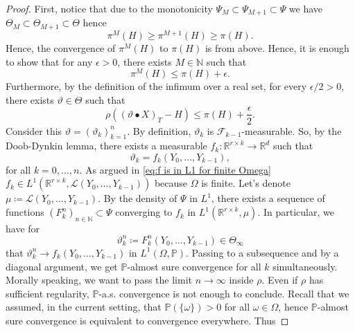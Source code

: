 \documentclass[11pt,a4paper,twoside,openany]{report}
\theoremstyle{plain} %
\theoremstyle{definition} %
\theoremstyle{remark} %
\begin{document}
\begin{proof}
 First, notice that due to the monotonicity \(\Psi_M\subset\Psi_{M+1}\subset\Psi\) we have \(\Theta_M\subset\Theta_{M+1}\subset\Theta\) hence 
 \begin{equation}
     \pi^M(H)\geq\pi^{M+1}(H)\geq\pi(H). 
 \end{equation}
 Hence, the convergence of \(\pi^M(H)\) to \(\pi(H)\) is from above. Hence, it is enough to show that for any \(\epsilon>0\), there exists \(M\in\mathbb{N}\) such that 
 \begin{equation}
     \pi^M(H)\leq \pi(H)+\epsilon.
 \end{equation}
 Furthermore, by the definition of the infimum over a real set, for every \(\epsilon/2>0\), there exists \(\vartheta\in\Theta\) such that
 \begin{equation}
     \rho((\vartheta\bullet X)_T-H)\leq\pi(H)+\frac{\epsilon}{2}.
 \end{equation}
 Consider this \(\vartheta=(\vartheta_k)_{k=1}^{n}\). By definition, \(\vartheta_k\) is \(\mathcal{F}_{k-1}\)-measurable. So, by the Doob-Dynkin lemma, there exists a measurable \(f_k:\mathbb{R}^{r\times k}\to\mathbb{R}^d\) such that 
 \begin{equation}
     \vartheta_k=f_k(Y_0,\dots,Y_{k-1}),
 \end{equation}
 for all \(k=0,\dots,n\). As argued in \cref{eq:f is in L1 for finite Omega} \(f_k\in L^1(\mathbb{R}^{r\times k},\mathcal{L}(Y_0,\dots,Y_{k-1}))\) because \(\Omega\) is finite. Let's denote \(\mu\coloneqq\mathcal{L}(Y_0,\dots,Y_{k-1})\). By the density of \(\Psi\) in \(L^1\), there exists a sequence of functions \((F_k^n)_{n\in\mathbb{N}}\subset \Psi\) converging to \(f_k\) in \(L^1(\mathbb{R}^{r\times k},\mu)\). In particular, we have for 
 \begin{equation}
     \vartheta_{k}^n\coloneqq F_{k}^n(Y_0,\dots,Y_{k-1})\in \Theta_{\infty}
 \end{equation}
 that \(\vartheta_{k}^n\to f_k(Y_0,\dots,Y_{k-1})\) in \(L^1(\Omega,\mathbb{P})\). Passing to a subsequence and by a diagonal argument, we get \(\mathbb{P}\)-almost sure convergence for all \(k\) simultaneously. Morally speaking, we want to pass the limit \(n\to\infty\) inside \(\rho\). Even if \(\rho\) has sufficient regularity, \(\mathbb{P}\)-a.s. convergence is not enough to conclude. Recall that we assumed, in the current setting, that \(\mathbb{P}(\{\omega\})>0\) for all \(\omega\in\Omega\), hence \(\mathbb{P}\)-almost sure convergence is equivalent to convergence everywhere. Thus

\end{proof}
\end{document}
